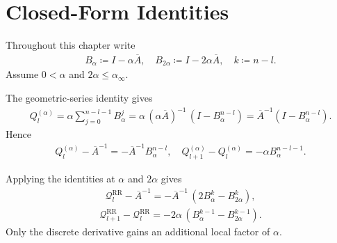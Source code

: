 
\section{Closed-Form Identities}

Throughout this chapter write
\begin{equation}
\begin{aligned}
B_\alpha \coloneqq I - \alpha \overline{A},
\quad
B_{2 \alpha} \coloneqq I - 2 \alpha \overline{A},
\quad
k \coloneqq n - l.
\end{aligned}
\end{equation}
Assume \(0 < \alpha\) and \(2 \alpha \le \alpha_\infty\).

The geometric-series identity gives
\begin{equation}
\begin{aligned}
Q_l^{(\alpha)}
  = \alpha \sum_{j = 0}^{n - l - 1} B_\alpha^j
  = \alpha \, (\alpha \overline{A})^{-1} \, (I - B_\alpha^{n - l})
  = \overline{A}^{-1} (I - B_\alpha^{n - l}).
\end{aligned}
\end{equation}
Hence
\begin{equation}
\begin{aligned}
Q_l^{(\alpha)} - \overline{A}^{-1} = - \overline{A}^{-1} B_\alpha^{n - l},
\quad
Q_{l + 1}^{(\alpha)} - Q_l^{(\alpha)} = - \alpha B_\alpha^{n - l - 1}.
\end{aligned}
\end{equation}

Applying the identities at \(\alpha\) and \(2 \alpha\) gives
\begin{equation}
\begin{aligned}
\mathcal{Q}_l^{\text{RR}} - \overline{A}^{-1}
  = - \overline{A}^{-1} \, (2 B_\alpha^k - B_{2 \alpha}^k),
\end{aligned}
\end{equation}
\begin{equation}
\begin{aligned}
\mathcal{Q}_{l + 1}^{\text{RR}} - \mathcal{Q}_l^{\text{RR}}
  = - 2 \alpha \, (B_\alpha^{k - 1} - B_{2 \alpha}^{k - 1}).
\end{aligned}
\end{equation}
Only the discrete derivative gains an additional local factor of \(\alpha\).
